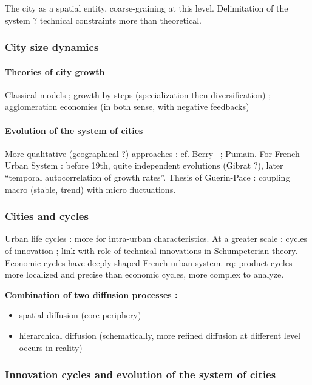 The city as a spatial entity, coarse-graining at this level. Delimitation of the system ? technical constraints more than theoretical.

\subsubsection{City size dynamics}

\paragraph{Theories of city growth}

Classical models ; growth by steps (specialization then diversification) ; agglomeration economies (in both sense, with negative feedbacks)

\paragraph{Evolution of the system of cities}

More qualitative (geographical ?) approaches : cf. Berry~\cite{berry1964cities} ; Pumain. For French Urban System : before 19th, quite independent evolutions (Gibrat ?), later ``temporal autocorrelation of growth rates''. Thesis of Guerin-Pace : coupling macro (stable, trend) with micro fluctuations.

\subsubsection{Cities and cycles}

Urban life cycles : more for intra-urban characteristics. At a greater scale : cycles of innovation ; link with role of technical innovations in Schumpeterian theory. Economic cycles have deeply shaped French urban system. rq: product cycles more localized and precise than economic cycles, more complex to analyze.

\textbf{Combination of two diffusion processes :}
\begin{itemize}
\item spatial diffusion (core-periphery)
\item hierarchical diffusion (schematically, more refined diffusion at different level occurs in reality)
\end{itemize}


\subsubsection{Innovation cycles and evolution of the system of cities}

